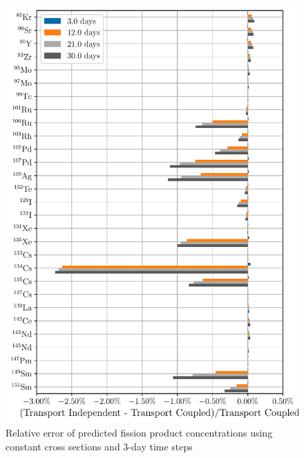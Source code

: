     \begin{figure}[h!tpb]
        \centering
        \includegraphics[width=\linewidth]{figs/fission_products_constant_xs_predictor_fission_q_days.pdf}
        \caption{Relative error of predicted fission product concentrations
        using constant cross sections and 3-day time steps}
        \label{fig:fp-error-constant-xs-days}
    \end{figure}

